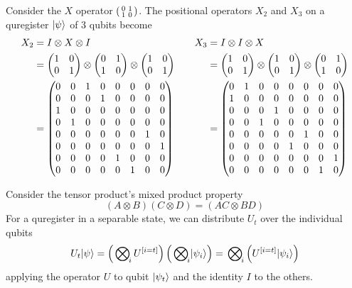 \documentclass[a4paper,11pt, oneside]{report}
\newcommand{\strongpar}{\medskip\par}
\begin{document}
\example \label{thm:ex-x3} Consider the $X$ operator $\left(\begin{smallmatrix}0 & 1 \\ 1 &0\end{smallmatrix}\right)$. The positional operators $X_2$ and $X_3$ on a quregister $\lvert\psi\rangle$ of 3 qubits become
\begin{align*}
X_2 &= I \otimes X \otimes I &&& X_3 &= I \otimes I \otimes X \\
 &= \begin{pmatrix}1 & 0 \\ 0 & 1\end{pmatrix} \otimes \begin{pmatrix}0 & 1 \\ 1 & 0\end{pmatrix} \otimes \begin{pmatrix}1 & 0 \\ 0 & 1\end{pmatrix} & &&     &= \begin{pmatrix}1 & 0 \\ 0 & 1\end{pmatrix} \otimes \begin{pmatrix}1 & 0 \\ 0 & 1\end{pmatrix} \otimes \begin{pmatrix}0 & 1 \\ 1 & 0\end{pmatrix} \\
   & = \begin{pmatrix}
       0 & 0 & 1 & 0 & 0 & 0 & 0 & 0 \\
       0 & 0 & 0 & 1 & 0 & 0 & 0 & 0 \\
       1 & 0 & 0 & 0 & 0 & 0 & 0 & 0 \\ 
       0 & 1 & 0 & 0 & 0 & 0 & 0 & 0 \\ 
       0 & 0 & 0 & 0 & 0 & 0 & 1 & 0 \\
       0 & 0 & 0 & 0 & 0 & 0 & 0 & 1 \\
       0 & 0 & 0 & 0 & 1 & 0 & 0 & 0 \\ 
       0 & 0 & 0 & 0 & 0 & 1 & 0 & 0 \end{pmatrix}
 &&&
       &= \begin{pmatrix}
       0 & 1 & 0 & 0 & 0 & 0 & 0 & 0 \\
       1 & 0 & 0 & 0 & 0 & 0 & 0 & 0 \\
       0 & 0 & 0 & 1 & 0 & 0 & 0 & 0 \\ 
       0 & 0 & 1 & 0 & 0 & 0 & 0 & 0 \\ 
       0 & 0 & 0 & 0 & 0 & 1 & 0 & 0 \\
       0 & 0 & 0 & 0 & 1 & 0 & 0 & 0 \\
       0 & 0 & 0 & 0 & 0 & 0 & 0 & 1 \\ 
       0 & 0 & 0 & 0 & 0 & 0 & 1 & 0 \end{pmatrix}
\end{align*}


\strongpar
Consider the tensor product's mixed product property
$$(A\otimes B)(C \otimes D) = (AC \otimes BD)$$
For a quregister in a separable state, we can distribute $U_t$ over the individual qubits
$$U_t \lvert\psi\rangle = \left(\sideset{}{_{\negthinspace i}}\bigotimes U^{[i=t]}\right) \left(\sideset{}{_{\negthinspace i}}\bigotimes\lvert\psi_i\rangle\right) = \sideset{}{_{\negthinspace i}}\bigotimes\left(U^{[i=t]}\lvert\psi_i\rangle\right)$$
applying the operator $U$ to qubit $\lvert\psi_t\rangle$ and the identity $I$ to the others.
\end{document}
